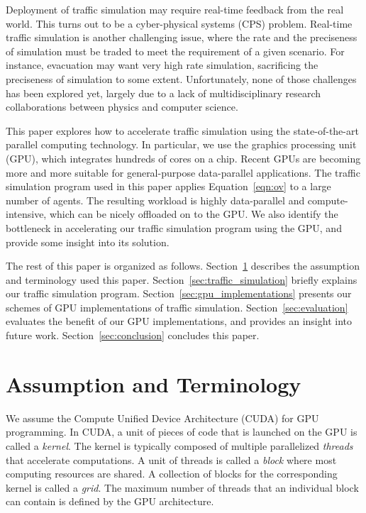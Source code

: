 \documentclass[times, 10pt, twocolumn]{article}
\begin{document}
Deployment of traffic simulation may require real-time feedback from the
real world.
This turns out to be a cyber-physical systems (CPS) problem.
Real-time traffic simulation is another challenging issue, where
the rate and the preciseness of simulation must be traded to meet the
requirement of a given scenario.
For instance, evacuation may want very high rate simulation, sacrificing
the preciseness of simulation to some extent.
Unfortunately, none of those challenges has been explored yet, largely
due to a lack of multidisciplinary research collaborations between physics
and computer science.

This paper explores how to accelerate traffic simulation using the
state-of-the-art parallel computing technology.
In particular, we use the graphics processing unit (GPU), which
integrates hundreds of cores on a chip.
Recent GPUs are becoming more and more suitable for general-purpose
data-parallel applications.
The traffic simulation program used in this paper applies
Equation~\eqref{eqn:ov} to a large number of agents.
The resulting workload is highly data-parallel and compute-intensive,
which can be nicely offloaded on to the GPU.
We also identify the bottleneck in accelerating our traffic simulation
program using the GPU, and provide some insight into its solution.

The rest of this paper is organized as follows.
Section~\ref{sec:assumption} describes the assumption and terminology
used this paper.
Section~\ref{sec:traffic_simulation} briefly explains our traffic
simulation program.
Section~\ref{sec:gpu_implementations} presents our schemes of GPU
implementations of traffic simulation.
Section~\ref{sec:evaluation} evaluates the benefit of our GPU
implementations, and provides an insight into future work.
Section~\ref{sec:conclusion} concludes this paper.

\section{Assumption and Terminology}
\label{sec:assumption}

We assume the Compute Unified Device Architecture (CUDA) for GPU
programming.
In CUDA, a unit of pieces of code that is launched on the GPU is called
a \textit{kernel}.
The kernel is typically composed of multiple parallelized
\textit{threads} that accelerate computations.
A unit of threads is called a \textit{block} where most computing
resources are shared.
A collection of blocks for the corresponding kernel is called a
\textit{grid}. 
The maximum number of threads that an individual block can contain is
defined by the GPU architecture.
\end{document}
